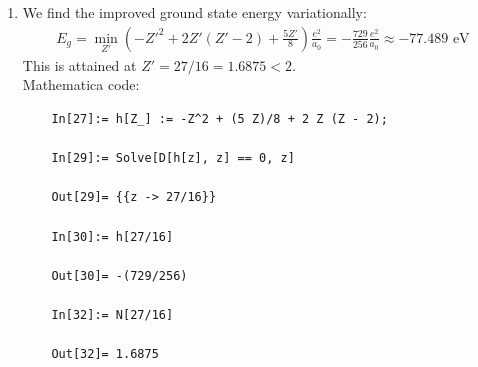 \documentclass{article}
\theoremstyle{definition}
\newcommand{\f}[2]{\frac{#1}{#2}}
\newcommand{\lp}{\left(}
\newcommand{\rp}{\right)}
\begin{document}
\begin{enumerate}[label=(\alph*)]
	
	Mathematica code:
	\begin{lstlisting}
	(*evaluate integral for <1/r1> = <1/r2> terms*)
	
	In[25]:= e^2*
	Integrate[
	g^2*(Z - 2)/r1*r2^2*Sin[t2]*r1^2*Sin[t1], {r1, 0, Infinity}, {r2, 0,
	Infinity}, {t1, 0, Pi}, {t2, 0, Pi}, {p1, 0, 2*Pi}, {p2, 0, 2*Pi},
	Assumptions -> {Z/a0 > 0}]
	
	Out[25]= (e^2 (-2 + Z) Z)/a0
	\end{lstlisting}
	
	
	\item We find the improved ground state energy variationally:
	\begin{align*}
	E_g = \min_{Z'} \lp -Z'^2 +2Z'(Z'-2) + \f{5 Z'}{8} \rp \f{e^2}{a_0} = -\f{729}{256}\f{e^2}{a_0} \approx \boxed{-77.489 \text{ eV}}
	\end{align*}
	This is attained at $Z' = 27/16 = 1.6875 < 2$.\\
	
	Mathematica code:
	\begin{lstlisting}
	In[27]:= h[Z_] := -Z^2 + (5 Z)/8 + 2 Z (Z - 2);
	
	In[29]:= Solve[D[h[z], z] == 0, z]
	
	Out[29]= {{z -> 27/16}}
	
	In[30]:= h[27/16]
	
	Out[30]= -(729/256)
	
	In[32]:= N[27/16]
	
	Out[32]= 1.6875
	\end{lstlisting}
	
\end{enumerate}
\end{document}
